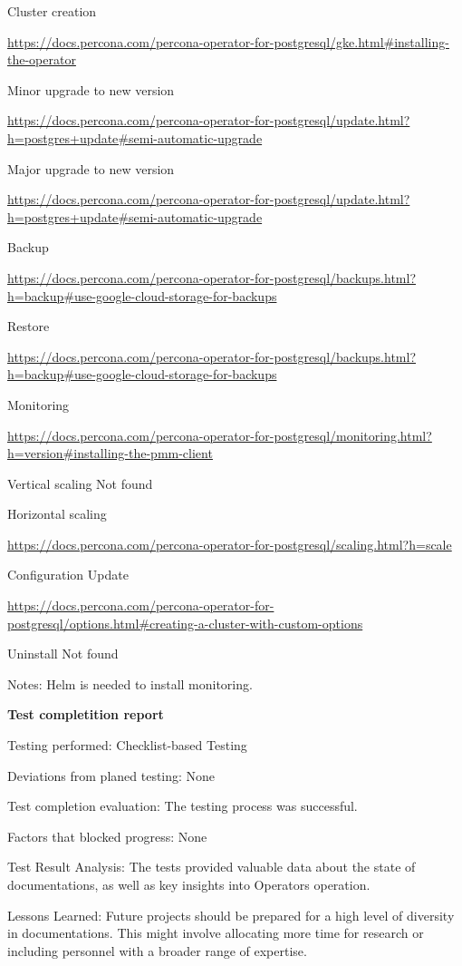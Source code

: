 Cluster creation

\url{https://docs.percona.com/percona-operator-for-postgresql/gke.html#installing-the-operator}

Minor upgrade to new version

\url{https://docs.percona.com/percona-operator-for-postgresql/update.html?h=postgres+update#semi-automatic-upgrade}

Major upgrade to new version

\url{https://docs.percona.com/percona-operator-for-postgresql/update.html?h=postgres+update#semi-automatic-upgrade}

Backup

\url{https://docs.percona.com/percona-operator-for-postgresql/backups.html?h=backup#use-google-cloud-storage-for-backups}

Restore

\url{https://docs.percona.com/percona-operator-for-postgresql/backups.html?h=backup#use-google-cloud-storage-for-backups}

Monitoring

\url{https://docs.percona.com/percona-operator-for-postgresql/monitoring.html?h=version#installing-the-pmm-client}

Vertical scaling
Not found

Horizontal scaling

\url{https://docs.percona.com/percona-operator-for-postgresql/scaling.html?h=scale}

Configuration Update

\url{https://docs.percona.com/percona-operator-for-postgresql/options.html#creating-a-cluster-with-custom-options}

Uninstall
Not found

Notes: Helm is needed to install monitoring.

\textbf{Test completition report}

Testing performed: Checklist-based Testing

Deviations from planed testing: None

Test completion evaluation: The testing process was successful.

Factors that blocked progress: None

Test Result Analysis: The tests provided valuable data about the state of documentations, as well as key insights into Operators operation.

Lessons Learned: Future projects should be prepared for a high level of diversity in documentations. This might involve allocating more time for research or including personnel with a broader range of expertise.


